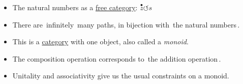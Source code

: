 \begin{itemize}
    \item The natural numbers as a \href{doc/1 math/Seven Sketches in Compositionality/Chapter 3: Databases/2 Categories/1 Free Categories/2 Free category on a graph}{free category}: $\boxed{\overset{\bullet}{z}\circlearrowleft s}$
    \item There are \,infinitely\, many paths, in bijection with \,the natural numbers\,.
    \item This is a \href{doc/1 math/Seven Sketches in Compositionality/Chapter 3: Databases/2 Categories/1 Free Categories/1 Category}{category} with one object, also called a \emph{monoid}.
    \item The composition operation corresponds to \,the addition operation\,.
    \item Unitality and associativity give us the usual constraints on a monoid.
  \end{itemize}